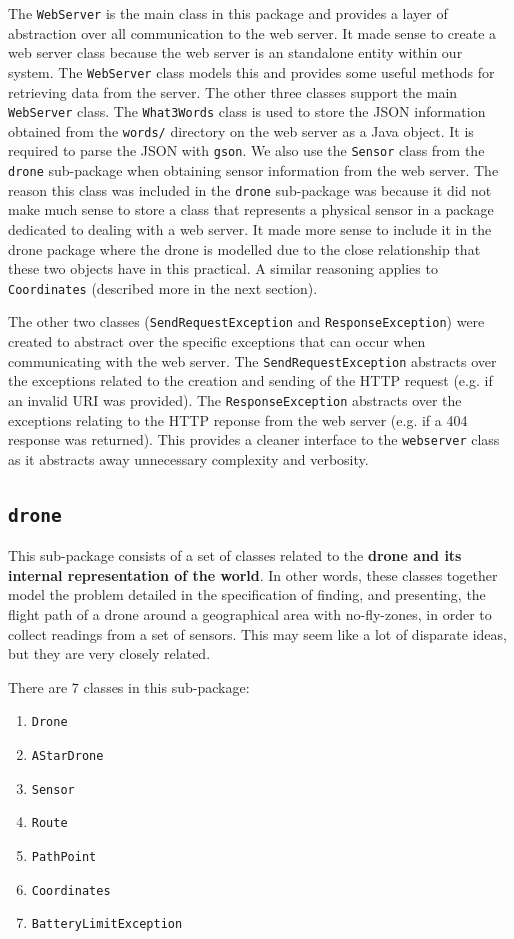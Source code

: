 \documentclass[11pt]{article}
\begin{document}
The \texttt{WebServer} is the main class in this package and provides a layer of abstraction over all communication to the web server. It made sense to create a web server class because the web server is an standalone entity within our system. The \texttt{WebServer} class models this and provides some useful methods for retrieving data from the server. The other three classes support the main \texttt{WebServer} class. The \texttt{What3Words} class is used to store the JSON information obtained from the \texttt{words/} directory on the web server as a Java object. It is required to parse the JSON with \texttt{gson}. We also use the \texttt{Sensor} class from the \texttt{drone} sub-package when obtaining sensor information from the web server. The reason this class was included in the \texttt{drone} sub-package was because it did not make much sense to store a class that represents a physical sensor in a package dedicated to dealing with a web server. It made more sense to include it in the drone package where the drone is modelled due to the close relationship that these two objects have in this practical. A similar reasoning applies to \texttt{Coordinates} (described more in the next section).

The other two classes (\texttt{SendRequestException} and \texttt{ResponseException}) were created to abstract over the specific exceptions that can occur when communicating with the web server. The \texttt{SendRequestException} abstracts over the exceptions related to the creation and sending of the HTTP request (e.g. if an invalid URI was provided). The \texttt{ResponseException} abstracts over the exceptions relating to the HTTP reponse from the web server (e.g. if a 404 response was returned). This provides a cleaner interface to the \texttt{webserver} class as it abstracts away unnecessary complexity and verbosity.

\subsection{\texttt{drone}}
This sub-package consists of a set of classes related to the \textbf{drone and its internal representation of the world}. In other words, these classes together model the problem detailed in the specification of finding, and presenting, the flight path of a drone around a geographical area with no-fly-zones, in order to collect readings from a set of sensors. This may seem like a lot of disparate ideas, but they are very closely related.

There are 7 classes in this sub-package:
\begin{enumerate}[topsep=0pt, itemsep=0pt]
    \item \texttt{Drone}
    \item \texttt{AStarDrone}
    \item \texttt{Sensor}
    \item \texttt{Route}
    \item \texttt{PathPoint}
    \item \texttt{Coordinates}
    \item \texttt{BatteryLimitException}
\end{enumerate}
\end{document}
